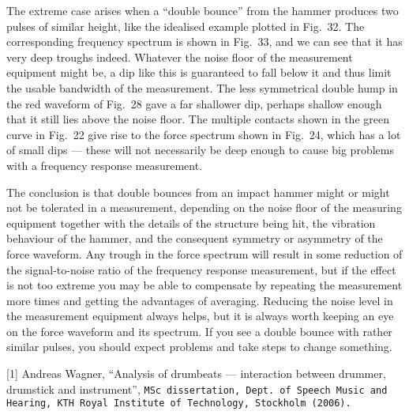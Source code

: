   The extreme case arises when a “double bounce” from the hammer produces two 
  pulses of similar height, like the idealised example plotted in Fig.\ 32. The 
  corresponding frequency spectrum is shown in Fig.\ 33, and we can see that it 
  has very deep troughs indeed. Whatever the noise floor of the measurement 
  equipment might be, a dip like this is guaranteed to fall below it and thus 
  limit the usable bandwidth of the measurement. The less symmetrical double 
  hump in the red waveform of Fig.\ 28 gave a far shallower dip, perhaps 
  shallow enough that it still lies above the noise floor. The multiple 
  contacts shown in the green curve in Fig.\ 22 give rise to the force spectrum 
  shown in Fig.\ 24, which has a lot of small dips --- these will not 
  necessarily be deep enough to cause big problems with a frequency response 
  measurement. 



  The conclusion is that double bounces from an impact hammer might or might 
  not be tolerated in a measurement, depending on the noise floor of the 
  measuring equipment together with the details of the structure being hit, the 
  vibration behaviour of the hammer, and the consequent symmetry or asymmetry 
  of the force waveform. Any trough in the force spectrum will result in some 
  reduction of the signal-to-noise ratio of the frequency response measurement, 
  but if the effect is not too extreme you may be able to compensate by 
  repeating the measurement more times and getting the advantages of averaging. 
  Reducing the noise level in the measurement equipment always helps, but it is 
  always worth keeping an eye on the force waveform and its spectrum. If you 
  see a double bounce with rather similar pulses, you should expect problems 
  and take steps to change something. 

  \sectionreferences{}[1] Andreas Wagner, “Analysis of drumbeats — interaction 
  between drummer, drumstick and instrument”, \tt{}MSc dissertation\rm{}, Dept. 
  of Speech Music and Hearing, KTH Royal Institute of Technology, Stockholm 
  (2006). 